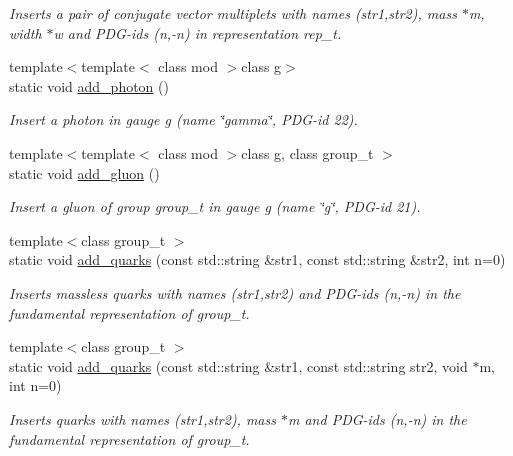 \begin{DoxyCompactItemize}
\begin{DoxyCompactList}\small\item\em Inserts a pair of conjugate vector multiplets with names (str1,str2), mass $\ast$m, width $\ast$w and P\+D\+G-\/ids (n,-\/n) in representation rep\+\_\+t. \end{DoxyCompactList}\item 
{\footnotesize template$<$template$<$ class mod $>$class g$>$ }\\static void \hyperlink{a00372_a011d03cd0180b4b7fc6cfdee3444a43c}{add\+\_\+photon} ()
\begin{DoxyCompactList}\small\item\em Insert a photon in gauge g (name \char`\"{}gamma\char`\"{}, P\+D\+G-\/id 22). \end{DoxyCompactList}\item 
{\footnotesize template$<$template$<$ class mod $>$class g, class group\+\_\+t $>$ }\\static void \hyperlink{a00372_a72e2d95ddeb7b482732e86b7b45d4b9d}{add\+\_\+gluon} ()
\begin{DoxyCompactList}\small\item\em Insert a gluon of group group\+\_\+t in gauge g (name \char`\"{}g\char`\"{}, P\+D\+G-\/id 21). \end{DoxyCompactList}\item 
{\footnotesize template$<$class group\+\_\+t $>$ }\\static void \hyperlink{a00372_a3e03c5b326768183c974de1e3fa06fc1}{add\+\_\+quarks} (const std\+::string \&str1, const std\+::string \&str2, int n=0)
\begin{DoxyCompactList}\small\item\em Inserts massless quarks with names (str1,str2) and P\+D\+G-\/ids (n,-\/n) in the fundamental representation of group\+\_\+t. \end{DoxyCompactList}\item 
{\footnotesize template$<$class group\+\_\+t $>$ }\\static void \hyperlink{a00372_a865da3783727b5c5e33d3b7345eb0cf1}{add\+\_\+quarks} (const std\+::string \&str1, const std\+::string str2, void $\ast$m, int n=0)
\begin{DoxyCompactList}\small\item\em Inserts quarks with names (str1,str2), mass $\ast$m and P\+D\+G-\/ids (n,-\/n) in the fundamental representation of group\+\_\+t. \end{DoxyCompactList}\item 

\end{DoxyCompactItemize}
